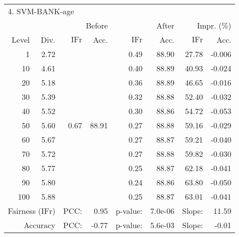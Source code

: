 \begin{tabular}{rr||rr|rr|rr}
\multicolumn{4}{l}{4. SVM-BANK-age} & \multicolumn{2}{c}{} & \multicolumn{2}{c}{}\\
 &  & \multicolumn{2}{r|}{Before} & \multicolumn{2}{r|}{After} & \multicolumn{2}{r}{Impr. (\%)}\\
Level & Div. & $\mathrm{IFr}$ & Acc. & $\mathrm{IFr}$ & Acc. & $\mathrm{IFr}$ & Acc.\\
\hline
1 & 2.72 & \multirow{11}{*}{0.67} & \multirow{11}{*}{88.91} & 0.49 & 88.90 & 27.78 & -0.006\\
10 & 4.61 &  &  & 0.40 & 88.89 & 40.93 & -0.024\\
20 & 5.18 &  &  & 0.36 & 88.89 & 46.65 & -0.016\\
30 & 5.39 &  &  & 0.32 & 88.88 & 52.40 & -0.032\\
40 & 5.52 &  &  & 0.30 & 88.86 & 54.72 & -0.053\\
50 & 5.60 &  &  & 0.27 & 88.88 & 59.16 & -0.029\\
60 & 5.67 &  &  & 0.27 & 88.87 & 59.21 & -0.040\\
70 & 5.72 &  &  & 0.27 & 88.88 & 59.82 & -0.030\\
80 & 5.77 &  &  & 0.25 & 88.87 & 62.18 & -0.041\\
90 & 5.80 &  &  & 0.24 & 88.86 & 63.80 & -0.050\\
100 & 5.88 &  &  & 0.25 & 88.87 & 63.01 & -0.041\\
\hline
\multicolumn{2}{r}{Fairness ($\mathrm{IFr}$)} & PCC: & \multicolumn{1}{r}{0.95} & p-value:  & \multicolumn{1}{r}{7.0e-06} & Slope:  & 11.59\\
\multicolumn{2}{r}{Accuracy} & PCC: & \multicolumn{1}{r}{-0.77} & p-value:  & \multicolumn{1}{r}{5.6e-03} & Slope:  & -0.01\\
\end{tabular}